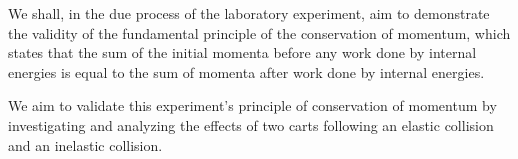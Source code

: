 {We shall, in the due process of the laboratory experiment, aim to demonstrate the validity of the fundamental principle of the conservation of momentum, which states that the sum of the initial momenta before any work done by internal energies is equal to the sum of momenta after work done by internal energies.}

{We aim to validate this experiment's principle of conservation of momentum by investigating and analyzing the effects of two carts following an elastic collision and an inelastic collision.}

{}

